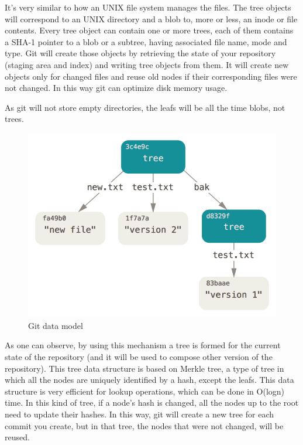         It's very similar to how an UNIX file system manages the files. The tree objects will correspond to an UNIX directory and a blob to, more or less, an inode or file contents. Every tree object can contain one or more trees, each of them contains a SHA-1 pointer to a blob or a subtree, having associated file name, mode and type. Git will create those objects by retrieving the state of your repository (staging area and index) and writing tree objects from them. It will create new objects only for changed files and reuse old nodes if their corresponding files were not changed. In this way git can optimize disk memory usage.
        
        As git will not store empty directories, the leafs will be all the time blobs, not trees.
        
        \begin{figure}[h]
           \begin{center}
               \includegraphics[width=15cm]{theoretical/data-model-2.png}
            \end{center}
            \label{fig:git-objects}\caption{Git data model \cite{GOBJ}}
        \end{figure}
        
        As one can observe, by using this mechanism a tree is formed for the current state of the repository (and it will be used to compose other version of the repository). This tree data structure is based on Merkle tree, a type of tree in which all the nodes are uniquely identified by a hash, except the leafs. This data structure is very efficient for lookup operations, which can be done in O(logn) time. In this kind of tree, if a node's hash is changed, all the nodes up to the root need to update their hashes. In this way, git will create a new tree for each commit you create, but in that tree, the nodes that were not changed, will be reused.
        
